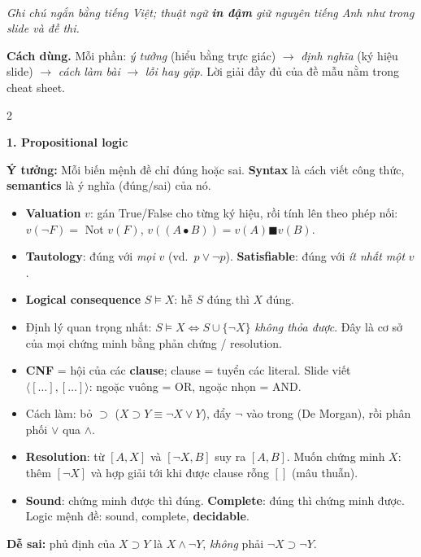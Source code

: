 \documentclass[10pt]{article}
\newcommand{\kw}[1]{\textbf{#1}}
\newcommand{\sect}[1]{\par\vspace{6pt}\noindent\colorbox{h1}{\parbox{\dimexpr\linewidth-2\fboxsep}{\large\bfseries\color{white}#1}}\par\vspace{2pt}}
\newcommand{\sub}[1]{\par\vspace{3pt}{\bfseries\color{h2}#1}\par}
\newcommand{\idea}[1]{\par\noindent\colorbox{bg}{\parbox{\dimexpr\linewidth-2\fboxsep}{\textbf{Ý tưởng:} #1}}\par}
\newcommand{\warn}[1]{\par\noindent\colorbox{wn}{\parbox{\dimexpr\linewidth-2\fboxsep}{\textbf{Dễ sai:} #1}}\par}
\newcommand{\impl}{\supset}
\newcommand{\gd}[1]{[#1]}
\newcommand{\gc}[1]{\langle #1\rangle}
\begin{document}
{\\[2pt]
{\itshape Ghi chú ngắn bằng tiếng Việt; thuật ngữ \textbf{in đậm} giữ nguyên tiếng Anh như trong slide và đề thi.}\par}
\vspace{4pt}
\textbf{Cách dùng.} Mỗi phần: \emph{ý tưởng} (hiểu bằng trực giác) $\to$ \emph{định nghĩa} (ký hiệu slide) $\to$ \emph{cách làm bài} $\to$ \emph{lỗi hay gặp}. Lời giải đầy đủ của đề mẫu nằm trong cheat sheet.

\begin{multicols}{2}
\sect{1. Propositional logic}
\idea{Mỗi biến mệnh đề chỉ đúng hoặc sai. \kw{Syntax} là cách viết công thức, \kw{semantics} là ý nghĩa (đúng/sai) của nó.}
\begin{itemize}
\item \kw{Valuation} $v$: gán True/False cho từng ký hiệu, rồi tính lên theo phép nối: $v(\neg F)=$ Not $v(F)$, $v((A\bullet B))=v(A)\blacksquare v(B)$.
\item \kw{Tautology}: đúng với \emph{mọi} $v$ (vd.\ $p\vee\neg p$). \kw{Satisfiable}: đúng với \emph{ít nhất một} $v$.
\item \kw{Logical consequence} $S\models X$: hễ $S$ đúng thì $X$ đúng.
\item Định lý quan trọng nhất: $S\models X\iff S\cup\{\neg X\}$ \emph{không thỏa được}. Đây là cơ sở của mọi chứng minh bằng phản chứng / resolution.
\end{itemize}
\sub{Đưa về CNF và resolution}
\begin{itemize}
\item \kw{CNF} = hội của các \kw{clause}; clause = tuyển các literal. Slide viết $\gc{\gd{\ldots},\gd{\ldots}}$: ngoặc vuông = OR, ngoặc nhọn = AND.
\item Cách làm: bỏ $\impl$ ($X\impl Y\equiv\neg X\vee Y$), đẩy $\neg$ vào trong (De Morgan), rồi phân phối $\vee$ qua $\wedge$.
\item \kw{Resolution}: từ $\gd{A,X}$ và $\gd{\neg X,B}$ suy ra $\gd{A,B}$. Muốn chứng minh $X$: thêm $\gd{\neg X}$ và hợp giải tới khi được clause rỗng $\gd{}$ (mâu thuẫn).
\item \kw{Sound}: chứng minh được thì đúng. \kw{Complete}: đúng thì chứng minh được. Logic mệnh đề: sound, complete, \kw{decidable}.
\end{itemize}
\warn{phủ định của $X\impl Y$ là $X\wedge\neg Y$, \emph{không} phải $\neg X\impl\neg Y$.}


\end{multicols}
\end{document}
